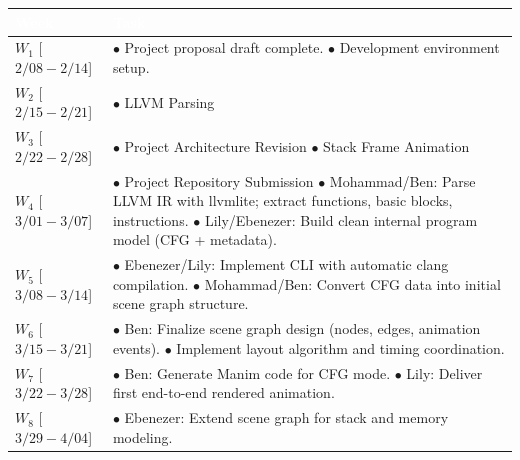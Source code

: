 
\begin{table}[htbp]
\centering
\renewcommand{\arraystretch}{1.5}
\begin{tabularx}{\columnwidth}{|>{\centering\arraybackslash}m{2.5cm}|>{\raggedright\arraybackslash}X|}
\hline
\rowcolor[HTML]{4472C4}
\textcolor{white}{\textbf{Week}} & \textcolor{white}{\textbf{Task}} \\ \hline
$W_1$    [$2/08 - 2/14$] & $\bullet$ Project proposal draft complete. \newline
                           $\bullet$ Development environment setup. \\ \hline
$W_2$    [$2/15 - 2/21$] & $\bullet$ LLVM Parsing \\ \hline
$W_3$    [$2/22 - 2/28$] & $\bullet$ Project Architecture Revision \newline
                           $\bullet$ Stack Frame Animation \\ \hline
$W_4$    [$3/01 - 3/07$] & $\bullet$ Project Repository Submission \newline
                           $\bullet$ Mohammad/Ben: Parse LLVM IR with llvmlite; extract functions, basic blocks, instructions. \newline
                           $\bullet$ Lily/Ebenezer: Build clean internal program model (CFG + metadata). \\ \hline
$W_5$    [$3/08 - 3/14$] & $\bullet$ Ebenezer/Lily: Implement CLI with automatic clang compilation. \newline
                           $\bullet$ Mohammad/Ben: Convert CFG data into initial scene graph structure. \\ \hline
$W_6$    [$3/15 - 3/21$] & $\bullet$ Ben: Finalize scene graph design (nodes, edges, animation events). \newline
                           $\bullet$ Implement layout algorithm and timing coordination.\\ \hline
$W_7$    [$3/22 - 3/28$] & $\bullet$ Ben: Generate Manim code for CFG mode. \newline
                           $\bullet$ Lily: Deliver first end-to-end rendered animation. \\ \hline
$W_8$    [$3/29 - 4/04$] & $\bullet$ Ebenezer: Extend scene graph for stack and memory modeling. \newline

\end{tabularx}
\end{table}
